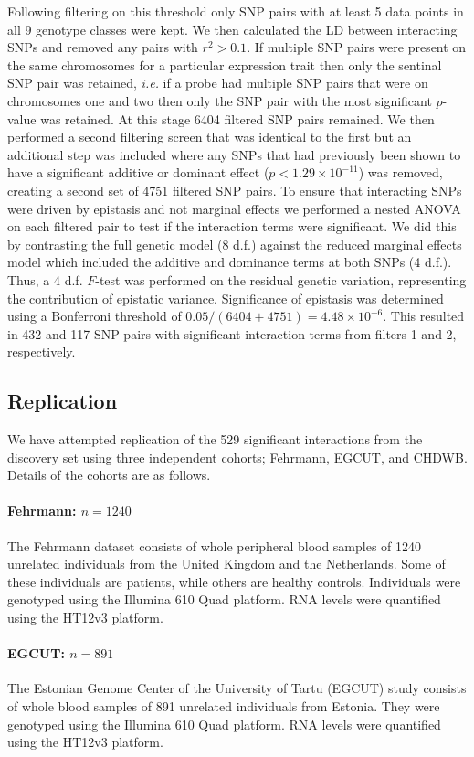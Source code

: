 \documentclass{article}
\begin{document}
Following filtering on this threshold only SNP pairs with at least 5 data points in all 9 genotype classes were kept. We then calculated the LD between interacting SNPs and removed any pairs with $r^2 > 0.1$. If multiple SNP pairs were present on the same chromosomes for a particular expression trait then only the sentinal SNP pair was retained, \emph{i.e.} if a probe had multiple SNP pairs that were on chromosomes one and two then only the SNP pair with the most significant $p$-value was retained. At this stage 6404 filtered SNP pairs remained. We then performed a second filtering screen that was identical to the first but an additional step was included where any SNPs that had previously been shown to have a significant additive or dominant effect ($p < 1.29 \times 10^{-11}$) was removed, creating a second set of 4751 filtered SNP pairs. To ensure that interacting SNPs were driven by epistasis and not marginal effects we performed a nested ANOVA on each filtered pair to test if the interaction terms were significant. We did this by contrasting the full genetic model (8 d.f.) against the reduced marginal effects model which included the additive and dominance terms at both SNPs (4 d.f.). Thus, a 4 d.f. $F$-test was performed on the residual genetic variation, representing the contribution of epistatic variance. Significance of epistasis was determined using a Bonferroni threshold of $0.05 / (6404+4751) = 4.48 \times 10^{-6}$. This resulted in 432 and 117 SNP pairs with significant interaction terms from filters 1 and 2, respectively.


\subsection{Replication}
We have attempted replication of the 529 significant interactions from the discovery set using three independent cohorts; Fehrmann, EGCUT, and CHDWB. Details of the cohorts are as follows.  

\paragraph{Fehrmann: $n=1240$}
The Fehrmann dataset consists of whole peripheral blood samples of 1240 unrelated individuals from the United Kingdom and the Netherlands. Some of these individuals are patients, while others are healthy controls. Individuals were genotyped using the Illumina 610 Quad platform. RNA levels were quantified using the HT12v3 platform.

\paragraph{EGCUT: $n=891$}
The Estonian Genome Center of the University of Tartu (EGCUT) study consists of whole blood samples of 891 unrelated individuals from Estonia. They were genotyped using the Illumina 610 Quad platform. RNA levels were quantified using the HT12v3 platform.
\end{document}
